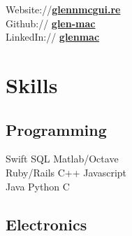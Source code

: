 \documentclass[letterpaper]{deedy-resume} %
\begin{document}
\begin{minipage}[t]{0.33\textwidth}
Website://\href{http://glennmcgui.re}{\bf glennmcgui.re} \\
Github:// \href{https://github.com/glen-mac}{\bf glen-mac} \\
LinkedIn:// \href{https://au.linkedin.com/in/glenmac}{\bf glenmac} \\

\sectionspace %


%
%
%
%


\section{Skills}
\sectionspace %
\subsection{Programming}
\textbullet{} Swift \textbullet{} SQL \textbullet{} Matlab/Octave \\  \textbullet{} Ruby/Rails  \textbullet{} C++  \textbullet{} Javascript\\
\textbullet{} Java \textbullet{} Python \textbullet{} C  

\sectionspace %
\sectionspace %

\subsection{Electronics}


\end{minipage}
\end{document}
